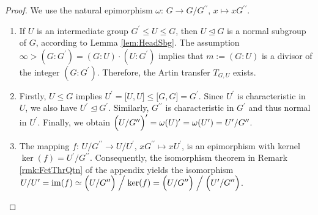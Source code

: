 \documentclass{amsart}
\theoremstyle{definition}
\numberwithin{equation}{section}
\begin{document}
\begin{proof}
We use the natural epimorphism \(\omega:\,G\to G/G^{\prime\prime}\), \(x\mapsto xG^{\prime\prime}\).

\begin{enumerate}

\item
If \(U\) is an intermediate group \(G^\prime\le U\le G\),
then \(U\unlhd G\) is a normal subgroup of \(G\), according to Lemma
\ref{lem:HeadSbg}.
The assumption \(\infty>(G:G^\prime)=(G:U)\cdot (U:G^\prime)\) implies
that \(m:=(G:U)\) is a divisor of the integer \((G:G^\prime)\).
Therefore, the Artin transfer \(T_{G,U}\) exists.

\item
Firstly, \(U\le G\) implies \(U^\prime=\lbrack U,U\rbrack\le\lbrack G,G\rbrack=G^\prime\).
Since \(U^\prime\) is characteristic in \(U\), we also have \(U^\prime\unlhd G^\prime\).
Similarly, \(G^{\prime\prime}\) is characteristic in \(G^\prime\) and thus normal in \(U^\prime\).
Finally, we obtain
\(\Bigl(U/G^{\prime\prime}\Bigr)^\prime=\omega(U)^\prime=\omega(U^\prime)=U^\prime/G^{\prime\prime}\).

\item
The mapping \(f:\,U/G^{\prime\prime}\to U/U^\prime\), \(xG^{\prime\prime}\mapsto xU^\prime\),
is an epimorphism with kernel \(\ker(f)=U^\prime/G^{\prime\prime}\).
Consequently, the isomorphism theorem in Remark
\ref{rmk:FctThrQtn}
of the appendix yields the isomorphism
\(U/U^\prime=\mathrm{im}(f)\simeq\Bigl(U/G^{\prime\prime}\Bigr)\Bigm/\ker(f)
=\Bigl(U/G^{\prime\prime}\Bigr)\Bigm/\Bigl(U^\prime/G^{\prime\prime}\Bigr)\).


\end{enumerate}
\end{proof}
\end{document}
